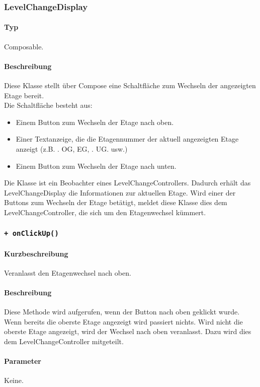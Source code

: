 \subsubsection{LevelChangeDisplay}
\paragraph*{Typ}
Composable.
\paragraph*{Beschreibung}
Diese Klasse stellt über Compose eine Schaltfläche zum Wechseln der angezeigten Etage bereit.\\
Die Schaltfläche besteht aus:
\begin{itemize}
    \item Einem Button zum Wechseln der Etage nach oben.
    \item Einer Textanzeige, die die Etagennummer der aktuell angezeigten Etage anzeigt 
    (z.B. . OG\dq, \dq EG\dq, . UG\dq. usw.)
    \item Einem Button zum Wechseln der Etage nach unten.
\end{itemize}
Die Klasse ist ein Beobachter eines LevelChangeControllers. Dadurch erhält das 
LevelChangeDisplay die Informationen zur aktuellen Etage. Wird einer der Buttons zum 
Wechseln der Etage betätigt, meldet diese Klasse dies dem LevelChangeController, 
die sich um den Etagenwechsel kümmert.

\subsubsection*{\texttt{+ onClickUp()}}%
\paragraph*{Kurzbeschreibung}
Veranlasst den Etagenwechsel nach oben.
\paragraph*{Beschreibung}
Diese Methode wird aufgerufen, wenn der Button nach oben geklickt wurde. \\
Wenn bereits die oberste Etage angezeigt wird passiert nichts. 
Wird nicht die oberste Etage angezeigt, wird der Wechsel nach oben veranlasst.
Dazu wird dies dem LevelChangeController mitgeteilt.
\paragraph*{Parameter}
Keine.
